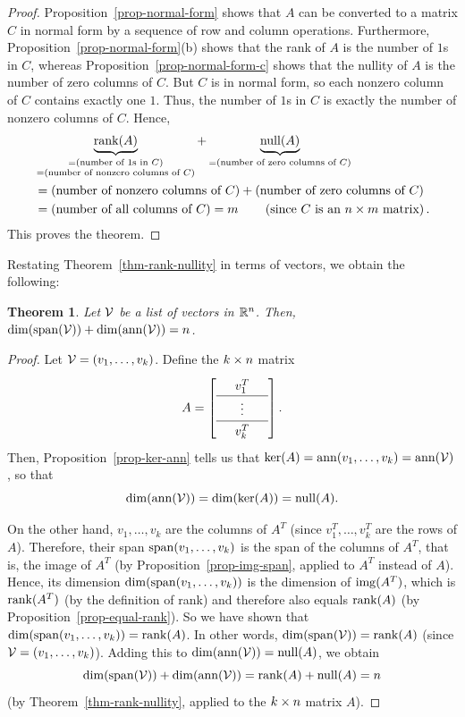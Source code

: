 \documentclass[reqno]{amsart}
\newcommand{\tup}[1]{\left( #1 \right)}
\newtheorem{theorem}{Theorem}[section]
\theoremstyle{definition}
\newcommand{\nullity}{\operatorname{null}}
\begin{document}
\begin{proof}
Proposition~\ref{prop-normal-form} shows that
$A$ can be converted to a matrix $C$ in normal
form by a sequence of row and column operations.
Furthermore, Proposition~\ref{prop-normal-form}(b)
shows that the rank of $A$ is the number of $1$s in $C$,
whereas Proposition~\ref{prop-normal-form-c}
shows that the nullity of $A$ is the number of
zero columns of $C$.
But $C$ is in normal form, so each nonzero column of
$C$ contains exactly one $1$.
Thus, the number of $1$s in $C$ is exactly the number
of nonzero columns of $C$.
Hence,
\begin{align*}
& \underbrace{\rnk(A)}_{\substack{= \tup{\text{number of $1$s in $C$}}
\\ = \tup{\text{number of nonzero columns of $C$}}}}
+ \underbrace{\nullity(A)}_{= \tup{\text{number of zero columns of $C$}}}
\\
&= \tup{\text{number of nonzero columns of $C$}}
+ \tup{\text{number of zero columns of $C$}}
\\
&= \tup{\text{number of all columns of $C$}} = m
\qquad \left(\text{since $C$ is an $n\tm m$ matrix}\right).
\end{align*}
This proves the theorem.
\end{proof}

Restating Theorem~\ref{thm-rank-nullity} in terms of vectors,
we obtain the following:

\begin{theorem}\label{thm-span-ann}
 Let $\mathcal{V}$ be a list of vectors in ${\mathbb{R}}^n$.
 Then, $\dim(\operatorname{span}(\mathcal{V})) + \dim(\operatorname{ann}(\mathcal{V})) = n$.
\end{theorem}

\begin{proof}
Let $\mathcal{V} = (v_1, \ldots, v_k)$.
Define the $k\times n$ matrix
 \[ \renewcommand{\arraystretch}{1.3} 
   A = \left[\begin{array}{ccc}
        & v_1^T & \\ \hline
        & \vdots & \\ \hline
        & v_k^T &
       \end{array}\right].
 \]
Then, Proposition~\ref{prop-ker-ann} tells us that
$\ker(A) = \operatorname{ann}(v_1,\dotsc,v_k) = \operatorname{ann}(\mathcal{V})$,
so that
\[
\dim(\ann(\CV)) = \dim(\ker(A)) = \nullity(A).
\]

On the other hand, $v_1, \ldots, v_k$ are the columns
of $A^T$ (since $v_1^T, \ldots, v_k^T$ are the rows of $A$).
Therefore, their span $\operatorname{span}(v_1, \ldots, v_k)$ is
the span of the columns of $A^T$, that is, the image of $A^T$
(by Proposition~\ref{prop-img-span}, applied to $A^T$
instead of $A$). Hence, its dimension
$\dim(\operatorname{span}(v_1, \ldots, v_k))$ is the dimension
of $\operatorname{img}(A^T)$, which is $\operatorname{rank}(A^T)$ (by the definition
of rank) and therefore also equals $\operatorname{rank}(A)$ (by
Proposition~\ref{prop-equal-rank}).
So we have shown that $\dim(\operatorname{span}(v_1, \ldots, v_k))
= \operatorname{rank}(A)$. In other words, $\dim(\operatorname{span}(\mathcal{V})) = \operatorname{rank}(A)$
(since $\mathcal{V} = (v_1, \ldots, v_k)$).
Adding this to $\dim(\ann(\CV)) = \nullity(A)$, we obtain
\[
\dim(\spn(\CV)) + \dim(\ann(\CV))
= \rnk(A) + \nullity(A) = n
\]
(by Theorem~\ref{thm-rank-nullity}, applied to the
$k\times n$ matrix $A$).
\end{proof}
\end{document}

